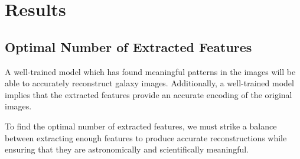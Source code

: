\documentclass[12pt, onecolumn]{article}
\begin{document}
\newpage

\section{Results} 
\label{Results}

    \subsection{Optimal Number of Extracted Features}
    \label{no_extracted_features}

    A well-trained model which has found meaningful patterns in the images will be able to accurately reconstruct galaxy images. Additionally, a well-trained model implies that the extracted features provide an accurate encoding of the original images. 
    
    To find the optimal number of extracted features, we must strike a balance between extracting enough features to produce accurate reconstructions while ensuring that they are astronomically and scientifically meaningful.
\end{document}
